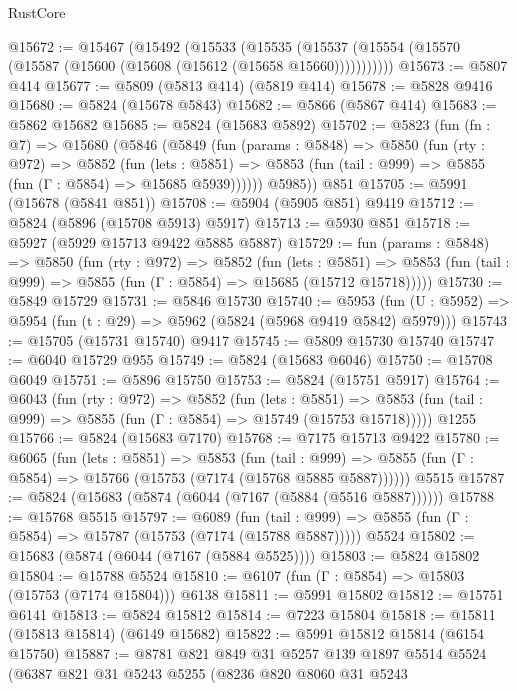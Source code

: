 \begin{lexlean}{RustCore}
\begin{coremodule}
@15672 := @15467
    (@15492
      (@15533
        (@15535 (@15537 (@15554 (@15570 (@15587 (@15600 (@15608 (@15612 (@15658 @15660)))))))))))
@15673 := @5807 @414
@15677 := @5809 (@5813 @414) (@5819 @414)
@15678 := @5828 @9416
@15680 := @5824 (@15678 @5843)
@15682 := @5866 (@5867 @414)
@15683 := @5862 @15682
@15685 := @5824 (@15683 @5892)
@15702 := @5823
    (fun (fn : @7) =>
    @15680
      (@5846
        (@5849
          (fun (params : @5848) =>
          @5850
            (fun (rty : @972) =>
            @5852
              (fun (lets : @5851) =>
              @5853 (fun (tail : @999) => @5855 (fun (Γ : @5854) => @15685 @5939))))))
        @5985))
    @851
@15705 := @5991 (@15678 (@5841 @851))
@15708 := @5904 (@5905 @851) @9419
@15712 := @5824 (@5896 (@15708 @5913) @5917)
@15713 := @5930 @851
@15718 := @5927 (@5929 @15713 @9422 @5885 @5887)
@15729 := fun (params : @5848) =>
  @5850
    (fun (rty : @972) =>
    @5852
      (fun (lets : @5851) =>
      @5853 (fun (tail : @999) => @5855 (fun (Γ : @5854) => @15685 (@15712 @15718)))))
@15730 := @5849 @15729
@15731 := @5846 @15730
@15740 := @5953
    (fun (U : @5952) => @5954 (fun (t : @29) => @5962 (@5824 (@5968 @9419 @5842) @5979)))
@15743 := @15705 (@15731 @15740) @9417
@15745 := @5809 @15730 @15740
@15747 := @6040 @15729 @955
@15749 := @5824 (@15683 @6046)
@15750 := @15708 @6049
@15751 := @5896 @15750
@15753 := @5824 (@15751 @5917)
@15764 := @6043
    (fun (rty : @972) =>
    @5852
      (fun (lets : @5851) =>
      @5853 (fun (tail : @999) => @5855 (fun (Γ : @5854) => @15749 (@15753 @15718)))))
    @1255
@15766 := @5824 (@15683 @7170)
@15768 := @7175 @15713 @9422
@15780 := @6065
    (fun (lets : @5851) =>
    @5853
      (fun (tail : @999) =>
      @5855 (fun (Γ : @5854) => @15766 (@15753 (@7174 (@15768 @5885 @5887))))))
    @5515
@15787 := @5824 (@15683 (@5874 (@6044 (@7167 (@5884 (@5516 @5887))))))
@15788 := @15768 @5515
@15797 := @6089
    (fun (tail : @999) => @5855 (fun (Γ : @5854) => @15787 (@15753 (@7174 (@15788 @5887)))))
    @5524
@15802 := @15683 (@5874 (@6044 (@7167 (@5884 @5525))))
@15803 := @5824 @15802
@15804 := @15788 @5524
@15810 := @6107 (fun (Γ : @5854) => @15803 (@15753 (@7174 @15804))) @6138
@15811 := @5991 @15802
@15812 := @15751 @6141
@15813 := @5824 @15812
@15814 := @7223 @15804
@15818 := @15811 (@15813 @15814) (@6149 @15682)
@15822 := @5991 @15812 @15814 (@6154 @15750)
@15887 := @8781
    @821
    @849
    @31
    @5257
    @139
    @1897
    @5514
    @5524
    (@6387
      @821
      @31
      @5243
      @5255
      (@8236
        @820
        @8060
        @31
        @5243

\end{coremodule}
\end{lexlean}
